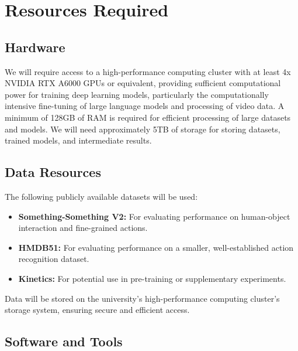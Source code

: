 \section{Resources Required}


\subsection{Hardware }
 We will require access to a high-performance computing cluster with at least 4x NVIDIA RTX A6000 GPUs or equivalent, providing sufficient computational power for training deep learning models, particularly the computationally intensive fine-tuning of large language models and processing of video data. A minimum of 128GB of RAM is required for efficient processing of large datasets and models. We will need approximately 5TB of storage for storing datasets, trained models, and intermediate results.

\subsection{ Data Resources}

The following publicly available datasets will be used:
\begin{itemize}[wide, labelindent=20pt]
    \item \textbf{Something-Something V2:} For evaluating performance on human-object interaction and fine-grained actions.
    \item \textbf{HMDB51:} For evaluating performance on a smaller, well-established action recognition dataset.
    \item \textbf{Kinetics:} For potential use in pre-training or supplementary experiments.
\end{itemize}

Data will be stored on the university's high-performance computing cluster's storage system, ensuring secure and efficient access.

\subsection{ Software and Tools}

